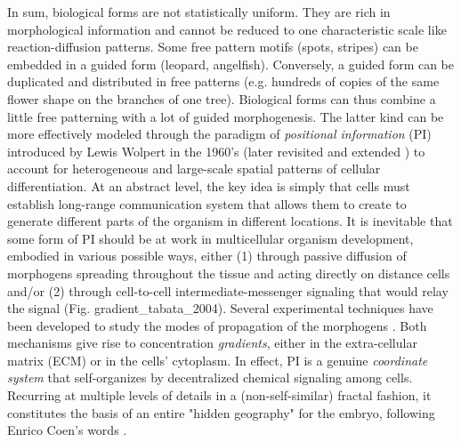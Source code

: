   In sum, biological forms are not statistically uniform. They are rich in morphological information and cannot be reduced to one characteristic scale like reaction-diffusion patterns. Some free pattern motifs (spots, stripes) can be embedded in a guided form (leopard, angelfish). Conversely, a guided form can be duplicated and distributed in free patterns (e.g. hundreds of copies of the same flower shape on the branches of one tree). Biological forms can thus combine a little free patterning with a lot of guided morphogenesis. The latter kind can be more effectively modeled through the paradigm of \textit{positional information} (PI) introduced by Lewis Wolpert in the 1960's \cite{Wolpert:1969wu} (later revisited and extended \cite{Wolpert:1989ut}\cite{Wolpert:1996tw}\cite{Wolpert:2011hw}) to account for heterogeneous and large-scale spatial patterns of cellular differentiation. At an abstract level, the key idea is simply that cells must establish long-range communication system that allows them to create to generate different parts of the organism in different locations. It is inevitable that some form of PI should be at work in multicellular organism development, embodied in various possible ways, either (1) through passive diffusion of morphogens spreading throughout the tissue and acting directly on distance cells and/or (2) through cell-to-cell intermediate-messenger signaling that would relay the signal \cite{Lawrence:2001bc}\cite{Lander:2002uo}\cite{Tabata:2004bp} (Fig. gradient_tabata_2004). Several experimental techniques have been developed to study the modes of propagation of the morphogens \cite{Kicheva:2012fw}. Both mechanisms give rise to concentration \textit{gradients}, either in the extra-cellular matrix (ECM) or in the cells' cytoplasm. In effect, PI is a genuine \textit{coordinate system} that self-organizes by decentralized chemical signaling among cells. Recurring at multiple levels of details in a (non-self-similar) fractal fashion, it constitutes the basis of an entire "hidden geography" for the embryo, following Enrico Coen's words \cite{Coen:1999wy}. 
